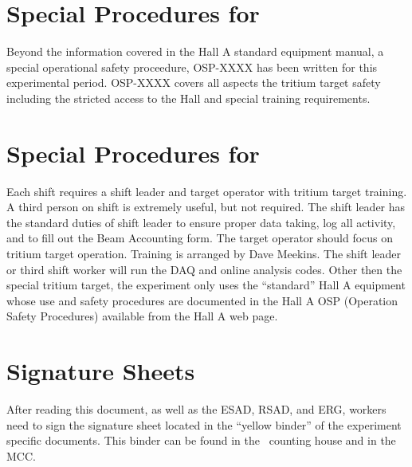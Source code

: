 
%
%
\newpage
\section{Special Procedures for \HALL}

Beyond the information covered in the Hall A standard equipment manual,
a special operational safety proceedure, OSP-XXXX has been written for this
experimental period.  OSP-XXXX covers all aspects the tritium target safety
including the stricted access to the Hall and special training requirements.

%
%
\newpage
\section{Special Procedures for \EXPTS}

Each shift requires a shift leader and target operator with tritium target training.
A third person on shift is extremely useful, but not required. The shift leader 
has the standard
duties of shift leader to ensure proper data taking, log all activity, and to fill out
the Beam Accounting form.  The target operator should focus on tritium target
operation.  Training is arranged by Dave Meekins.  The shift leader or third
shift worker will run the DAQ and online analysis codes.
Other then the special tritium target, the experiment only uses the ``standard'' Hall A equipment whose
use and safety procedures are documented in the Hall A OSP (Operation Safety
Procedures) available from the Hall A web page.

\newpage
\section{Signature Sheets}

After reading this document, as well as the ESAD, RSAD, and ERG, workers need to sign
the signature sheet located in the ``yellow binder'' of the experiment specific documents.
This binder can be found in the \HALL\ counting house and in the MCC.

